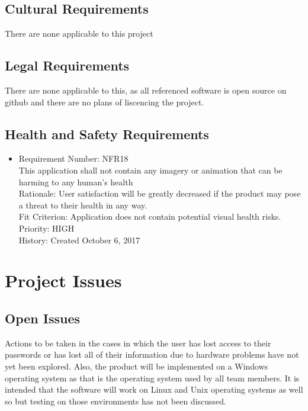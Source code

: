 \documentclass[12pt, titlepage]{article}
\begin{document}
\subsection{Cultural Requirements}
There are none applicable to this project

\subsection{Legal Requirements}

There are none applicable to this, as all referenced software is open source on github and there are no plans of liscencing the project.

\subsection{Health and Safety Requirements}
\begin{itemize}
	\item Requirement Number: NFR18\\
This application shall not contain any imagery or animation that can be harming to any human's health\\
Rationale: User satisfaction will be greatly decreased if the product may pose a threat to their health in any way.\\
Fit Criterion: Application does not contain potential visual health risks.\\
Priority: HIGH\\
History: Created October 6, 2017
\end{itemize}

\section{Project Issues}

\subsection{Open Issues}

Actions to be taken in the cases in which the user has lost access to their passwords or has lost all of their information due to hardware problems have not yet been explored. Also, the product will be implemented on a Windows operating system as that is the operating system used by all team members. It is intended that the software will work on Linux and Unix operating systems as well so but testing on those environments has not been discussed.
\end{document}
